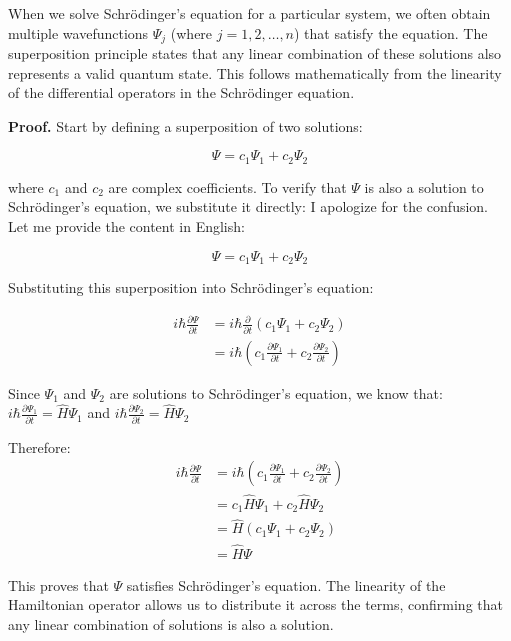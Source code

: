 \documentclass[10pt]{article}
\begin{document}
When we solve Schrödinger's equation for a particular system, we often obtain multiple wavefunctions $\Psi_{j}$ (where $j=1,2, \ldots, n$) that satisfy the equation. The superposition principle states that any linear combination of these solutions also represents a valid quantum state. This follows mathematically from the linearity of the differential operators in the Schrödinger equation.

\textbf{Proof.} Start by defining a superposition of two solutions:

\begin{equation*}
\Psi=c_{1} \Psi_{1}+c_{2} \Psi_{2} \tag{1.19}
\end{equation*}

where $c_1$ and $c_2$ are complex coefficients. To verify that $\Psi$ is also a solution to Schrödinger's equation, we substitute it directly:
I apologize for the confusion. Let me provide the content in English:


\begin{equation*}
\Psi=c_{1} \Psi_{1}+c_{2} \Psi_{2} \tag{1.19}
\end{equation*}

Substituting this superposition into Schrödinger's equation:

\begin{align*}
i \hbar \frac{\partial \Psi}{\partial t} &= i \hbar \frac{\partial}{\partial t}\left(c_{1} \Psi_{1}+c_{2} \Psi_{2}\right) \\
&= i \hbar\left(c_{1} \frac{\partial \Psi_{1}}{\partial t}+c_{2} \frac{\partial \Psi_{2}}{\partial t}\right) \tag{1.20}
\end{align*}

Since $\Psi_1$ and $\Psi_2$ are solutions to Schrödinger's equation, we know that:
$i \hbar \frac{\partial \Psi_1}{\partial t} = \hat{H}\Psi_1$ and $i \hbar \frac{\partial \Psi_2}{\partial t} = \hat{H}\Psi_2$

Therefore:
\begin{align*}
i \hbar \frac{\partial \Psi}{\partial t} &= i \hbar\left(c_{1} \frac{\partial \Psi_{1}}{\partial t}+c_{2} \frac{\partial \Psi_{2}}{\partial t}\right) \\
&= c_{1} \hat{H} \Psi_{1}+c_{2} \hat{H} \Psi_{2} \\
&= \hat{H}\left(c_{1} \Psi_{1}+c_{2} \Psi_{2}\right) \\
&= \hat{H} \Psi
\end{align*}

This proves that $\Psi$ satisfies Schrödinger's equation. The linearity of the Hamiltonian operator allows us to distribute it across the terms, confirming that any linear combination of solutions is also a solution.
\end{document}
